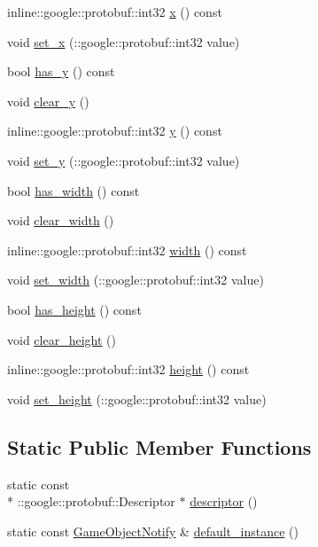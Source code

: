 \begin{DoxyCompactItemize}
\item 
inline\-::google\-::protobuf\-::int32 \hyperlink{class_game_object_notify_a29d7c1745284cc5b78956cc316376738}{x} () const 
\item 
void \hyperlink{class_game_object_notify_a998082bfecd2c4cb76c84065a65b8e2a}{set\-\_\-x} (\-::google\-::protobuf\-::int32 value)
\item 
bool \hyperlink{class_game_object_notify_a74513aef5aceea983df19a445352ccb9}{has\-\_\-y} () const 
\item 
void \hyperlink{class_game_object_notify_a6f7b06cf818edf08ea2d5c09fd769853}{clear\-\_\-y} ()
\item 
inline\-::google\-::protobuf\-::int32 \hyperlink{class_game_object_notify_aefde9869ad1e80659b4951398a460f57}{y} () const 
\item 
void \hyperlink{class_game_object_notify_a9b2ee70f340e34b895d5c58bbda1967a}{set\-\_\-y} (\-::google\-::protobuf\-::int32 value)
\item 
bool \hyperlink{class_game_object_notify_ac571c7cc6962f862a30b3ae8f61432c7}{has\-\_\-width} () const 
\item 
void \hyperlink{class_game_object_notify_abd5293bda07b2a790702c7e039d7115a}{clear\-\_\-width} ()
\item 
inline\-::google\-::protobuf\-::int32 \hyperlink{class_game_object_notify_a53e65ba98c60fada040ccb9b1691bc32}{width} () const 
\item 
void \hyperlink{class_game_object_notify_adc1447c2773f943ff80233f89af49bc6}{set\-\_\-width} (\-::google\-::protobuf\-::int32 value)
\item 
bool \hyperlink{class_game_object_notify_acb2fd8a9f778bb0c6dc559c757e7c326}{has\-\_\-height} () const 
\item 
void \hyperlink{class_game_object_notify_ace893d2ef8f4a322762f85a2ed674ec1}{clear\-\_\-height} ()
\item 
inline\-::google\-::protobuf\-::int32 \hyperlink{class_game_object_notify_a7af70a9bc8ddcbe3bed697f772a324fc}{height} () const 
\item 
void \hyperlink{class_game_object_notify_a4075dd8cd90d521540217508f9864503}{set\-\_\-height} (\-::google\-::protobuf\-::int32 value)
\end{DoxyCompactItemize}
\subsection*{Static Public Member Functions}
\begin{DoxyCompactItemize}
\item 
static const \\*
\-::google\-::protobuf\-::\-Descriptor $\ast$ \hyperlink{class_game_object_notify_aaca556ce856cfffb364b49e244fe84d6}{descriptor} ()
\item 
static const \hyperlink{class_game_object_notify}{Game\-Object\-Notify} \& \hyperlink{class_game_object_notify_a1638acf0c0d50781c9c6290c78621080}{default\-\_\-instance} ()
\end{DoxyCompactItemize}
